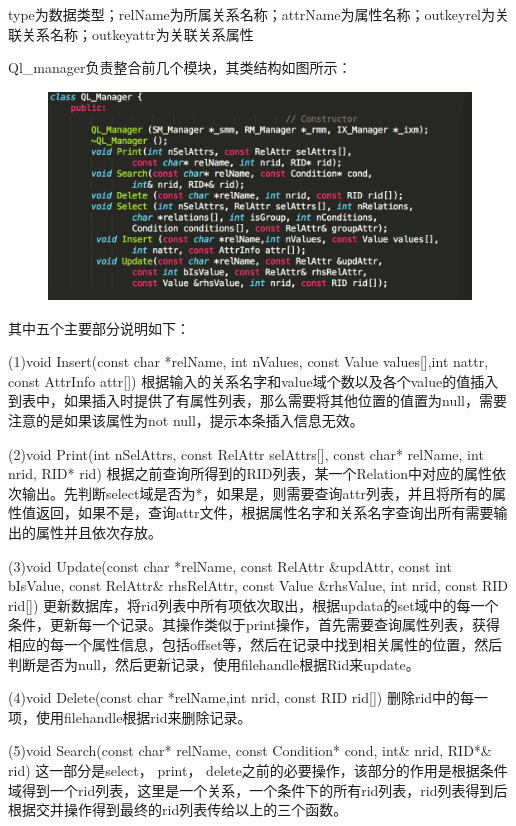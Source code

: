 type为数据类型；relName为所属关系名称；attrName为属性名称；outkeyrel为关联关系名称；outkeyattr为关联关系属性


Ql\_manager负责整合前几个模块，其类结构如图所示：
\begin{figure}[H]
\centering
\includegraphics[width=5in]{Figures/QL_Manager.jpg}
\end{figure}

其中五个主要部分说明如下：

(1)void Insert(const char  *relName, int  nValues, const Value values[],int nattr, const AttrInfo attr[])
根据输入的关系名字和value域个数以及各个value的值插入到表中，如果插入时提供了有属性列表，那么需要将其他位置的值置为null，需要注意的是如果该属性为not null，提示本条插入信息无效。

(2)void Print(int nSelAttrs, const RelAttr selAttrs[], const char* relName, int nrid, RID* rid)
根据之前查询所得到的RID列表，某一个Relation中对应的属性依次输出。先判断select域是否为*，如果是，则需要查询attr列表，并且将所有的属性值返回，如果不是，查询attr文件，根据属性名字和关系名字查询出所有需要输出的属性并且依次存放。

(3)void Update(const char *relName, const RelAttr \&updAttr, const int bIsValue, const RelAttr\& rhsRelAttr, const Value \&rhsValue, int nrid, const RID rid[])
更新数据库，将rid列表中所有项依次取出，根据updata的set域中的每一个条件，更新每一个记录。其操作类似于print操作，首先需要查询属性列表，获得相应的每一个属性信息，包括offset等，然后在记录中找到相关属性的位置，然后判断是否为null，然后更新记录，使用filehandle根据Rid来update。

(4)void Delete(const char *relName,int nrid, const RID rid[])
删除rid中的每一项，使用filehandle根据rid来删除记录。

(5)void Search(const char* relName, const Condition* cond, int\& nrid, RID*\& rid)
这一部分是select， print， delete之前的必要操作，该部分的作用是根据条件域得到一个rid列表，这里是一个关系，一个条件下的所有rid列表，rid列表得到后根据交并操作得到最终的rid列表传给以上的三个函数。

